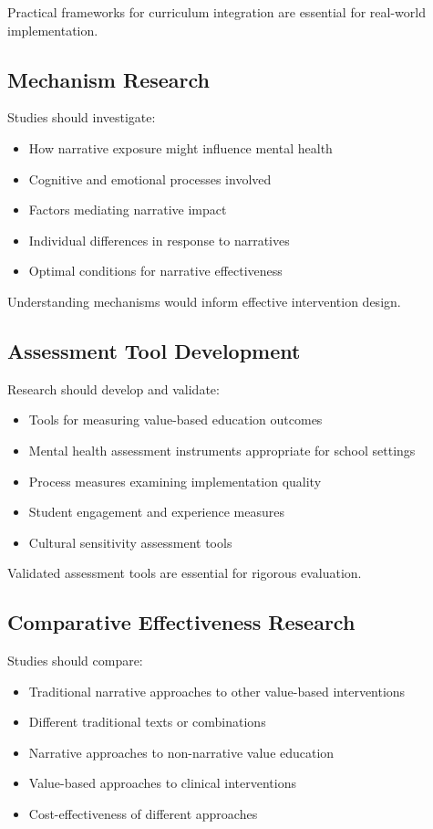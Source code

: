 \documentclass[12pt,a4paper,twocolumn]{article}
\begin{document}
Practical frameworks for curriculum integration are essential for real-world implementation.

\subsection{Mechanism Research}

Studies should investigate:
\begin{itemize}
    \item How narrative exposure might influence mental health
    \item Cognitive and emotional processes involved
    \item Factors mediating narrative impact
    \item Individual differences in response to narratives
    \item Optimal conditions for narrative effectiveness
\end{itemize}

Understanding mechanisms would inform effective intervention design.

\subsection{Assessment Tool Development}

Research should develop and validate:
\begin{itemize}
    \item Tools for measuring value-based education outcomes
    \item Mental health assessment instruments appropriate for school settings
    \item Process measures examining implementation quality
    \item Student engagement and experience measures
    \item Cultural sensitivity assessment tools
\end{itemize}

Validated assessment tools are essential for rigorous evaluation.

\subsection{Comparative Effectiveness Research}

Studies should compare:
\begin{itemize}
    \item Traditional narrative approaches to other value-based interventions
    \item Different traditional texts or combinations
    \item Narrative approaches to non-narrative value education
    \item Value-based approaches to clinical interventions
    \item Cost-effectiveness of different approaches
\end{itemize}
\end{document}
